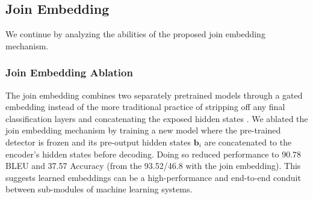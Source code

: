 \subsection{Join Embedding}



We continue by analyzing the abilities of the proposed join embedding mechanism.

\subsubsection{Join Embedding Ablation}
The join embedding combines two separately pretrained models through a gated embedding instead of the more traditional practice of stripping off any final classification layers and concatenating the exposed hidden states \cite{bengio2007greedy}. We ablated the join embedding mechanism by training a new model where the pre-trained detector is frozen and its pre-output hidden states $\mathbf{b}_i$ are concatenated to the encoder's hidden states before decoding. Doing so reduced performance to 90.78 BLEU and 37.57 Accuracy (from the 93.52/46.8 with the join embedding). This suggests learned embeddings can be a high-performance and end-to-end conduit between sub-modules of machine learning systems. %



